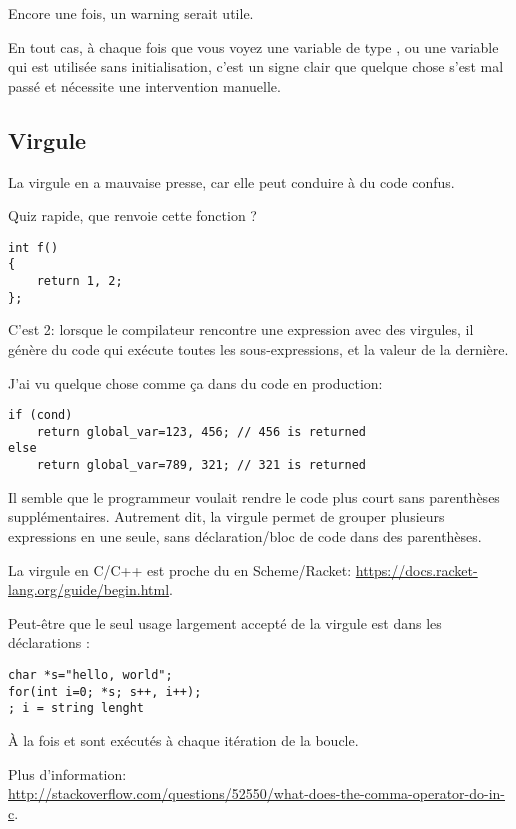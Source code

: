 Encore une fois, un warning serait utile.

En tout cas, à chaque fois que vous voyez une variable de type , ou une
variable qui est utilisée sans initialisation, c'est un signe clair que quelque chose
s'est mal passé et nécessite une intervention manuelle.

\subsection{Virgule}

La virgule en \CCpp a mauvaise presse, car elle peut conduire à du code confus.

Quiz rapide, que renvoie cette fonction \CCpp?

\begin{lstlisting}
int f()
{
	return 1, 2;
};
\end{lstlisting}

C'est 2: lorsque le compilateur rencontre une expression avec des virgules, il génère
du code qui exécute toutes les sous-expressions, et  la valeur de la
dernière.

J'ai vu quelque chose comme ça dans du code en production:

\begin{lstlisting}
if (cond)
	return global_var=123, 456; // 456 is returned
else
	return global_var=789, 321; // 321 is returned
\end{lstlisting}

Il semble que le programmeur voulait rendre le code plus court sans parenthèses supplémentaires.
Autrement dit, la virgule permet de grouper plusieurs expressions en une seule, sans
déclaration/bloc de code dans des parenthèses.

La virgule en C/C++ est proche du  en Scheme/Racket: \url{https://docs.racket-lang.org/guide/begin.html}.

Peut-être que le seul usage largement accepté de la virgule est dans les déclarations
:

\begin{lstlisting}
char *s="hello, world";
for(int i=0; *s; s++, i++);
; i = string lenght
\end{lstlisting}

À la fois  et  sont exécutés à chaque itération de la boucle.

Plus d'information:\\
\url{http://stackoverflow.com/questions/52550/what-does-the-comma-operator-do-in-c}.

